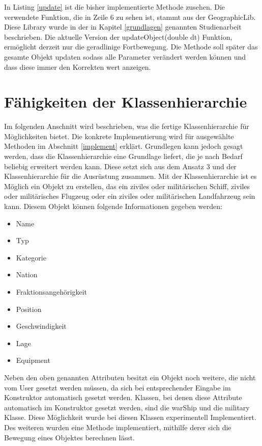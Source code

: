  In  Listing \ref{update} ist die bisher implementierte Methode zusehen. Die verwendete Funktion, die in Zeile 6 zu sehen ist, stammt aus der GeographicLib. Diese Library wurde in der in Kapitel \ref{grundlagen} genannten Studienarbeit beschrieben. Die aktuelle Version der  \glqq updateObject(double dt) \grqq{} Funktion, ermöglicht derzeit nur die geradlinige Fortbewegung. Die Methode soll später das gesamte Objekt updaten sodass alle Parameter verändert werden können und dass diese immer den Korrekten wert anzeigen.
 
 \section{Fähigkeiten der Klassenhierarchie}
Im folgenden Anschnitt wird beschrieben, was die fertige Klassenhierarchie für Möglichkeiten bietet. Die konkrete Implementierung wird für ausgewählte Methoden im Abschnitt \ref{implement} erklärt.
Grundlegen kann jedoch gesagt werden, dass die Klassenhierarchie eine Grundlage liefert, die je nach Bedarf beliebig erweitert werden kann.
Diese setzt sich aus dem Ansatz 3 und der Klassenhierarchie für die Ausrüstung zusammen. 
Mit der Klassenhierarchie ist es Möglich ein Objekt zu erstellen, das ein ziviles oder militärischen Schiff, ziviles oder militärisches Flugzeug oder ein ziviles oder militärischen Landfahrzeug sein kann. Diesem Objekt können folgende Informationen gegeben werden:
\begin{itemize}
	\singlespacing
	\item Name
	\item Typ
	\item Kategorie
	\item Nation
	\item Fraktionsangehörigkeit
	\item Position
	\item Geschwindigkeit
	\item Lage
	\item Equipment
\end{itemize}
Neben den oben genannten Attributen besitzt ein Objekt noch weitere, die nicht vom User gesetzt werden müssen, da sich bei entsprechender Eingabe im Konstruktor automatisch gesetzt werden. Klassen, bei denen diese Attribute automatisch im Konstruktor gesetzt werden, sind die \glqq warShip\grqq{} und die \glqq military\grqq{} Klasse. Diese Möglichkeit wurde bei diesen Klassen experimentell Implementiert.
Des weiteren wurden eine Methode implementiert, mithilfe derer sich die Bewegung eines Objektes berechnen lässt. \\
